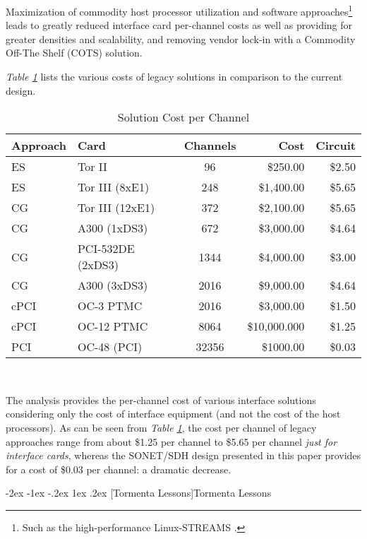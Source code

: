 \documentclass[letterpaper,final,notitlepage,twocolumn,10pt,twoside]{article}
\makeatletter
\renewcommand\section{\@startsection {section}{1}{\z@}%
                                   {-2ex \@plus -1ex \@minus -.2ex}%
                                   {1ex \@plus .2ex}%
                                   {\normalfont\large\bfseries}}
\makeatother
\begin{document}
Maximization of commodity host processor utilization and software
approaches\footnote{Such as the high-performance Linux-STREAMS \cite[]{LfS}.}
leads to greatly reduced interface card per-channel costs as well as providing
for greater densities and scalability, and removing vendor lock-in with a
Commodity Off-The Shelf (COTS) solution.

\textsl{Table \ref{table:channel}} lists the various costs of legacy solutions
in comparison to the current design.
\begin{table}[htp]
\footnotesize
\begin{center}
\setlength{\tabcolsep}{0.3em}
\setlength{\arraycolsep}{0.3em}
\begin{tabular}{llcrr}\\
Approach & Card & Channels & Cost & Circuit\\
\hline
ES & Tor II & 96 & \$250.00 & \$2.50\\
ES & Tor III (8xE1) & 248 & \$1,400.00 & \$5.65\\
CG & Tor III (12xE1) & 372 & \$2,100.00 & \$5.65\\
CG & A300 (1xDS3) & 672 & \$3,000.00 & \$4.64\\
CG & PCI-532DE (2xDS3) & 1344 & \$4,000.00 & \$3.00\\
CG & A300 (3xDS3) & 2016 & \$9,000.00 & \$4.64\\
cPCI & OC-3 PTMC & 2016 & \$3,000.00 & \$1.50\\
cPCI & OC-12 PTMC & 8064 & \$10,000.000 & \$1.25\\
\hline
PCI & OC-48 (PCI) & 32356 & \$1000.00 & \$0.03\\
\hline
\end{tabular}\\
\caption{Solution Cost per Channel}
\label{table:channel}
\end{center}
\normalsize
\end{table}
The analysis provides the per-channel cost of various interface solutions
considering only the cost of interface equipment (and not the cost of the host
processors).  As can be seen from \textsl{Table \ref{table:channel}}, the cost
per channel of legacy approaches range from about \$1.25 per channel to \$5.65
per channel \textit{just for interface cards}, whereas the SONET/SDH design
presented in this paper provides for a cost of \$0.03 per channel: a dramatic
decrease.

\section[Tormenta Lessons]{Tormenta Lessons}
\end{document}
